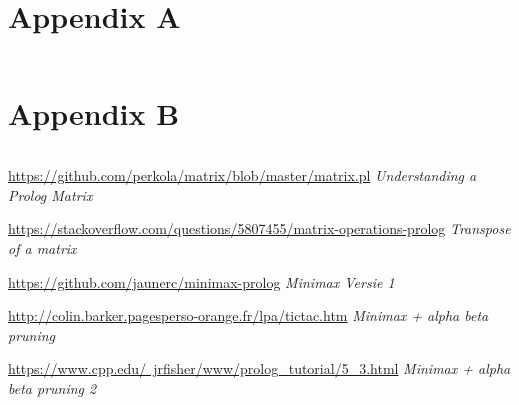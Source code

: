 \documentclass{article}
\begin{document}
\begin{appendices}
\section*{Appendix A}
\inputminted[firstline=104, lastline=124, linenos, breaklines]{prolog}{/Users/Victor/Documents/UGent/3BI/Logisch/Project/project/src/board.pl}

\section*{Appendix B}
\inputminted[firstline=155, lastline=183, linenos, breaklines]{prolog}{/Users/Victor/Documents/UGent/3BI/Logisch/Project/project/src/board.pl}

\end{appendices}

\begin{thebibliography}{5}

\href{https://github.com/perkola/matrix/blob/master/matrix.pl}{https://github.com/perkola/matrix/blob/master/matrix.pl}
\textit{Understanding a Prolog Matrix}

\href{https://stackoverflow.com/questions/5807455/matrix-operations-prolog}{https://stackoverflow.com/questions/5807455/matrix-operations-prolog}
\textit{Transpose of a matrix}

\href{https://github.com/jaunerc/minimax-prolog}{https://github.com/jaunerc/minimax-prolog}
\textit{Minimax Versie 1}

\href{http://colin.barker.pagesperso-orange.fr/lpa/tictac.htm}{http://colin.barker.pagesperso-orange.fr/lpa/tictac.htm}
\textit{Minimax + alpha beta pruning}

\href{https://www.cpp.edu/~jrfisher/www/prolog\_tutorial/5\_3.html}{https://www.cpp.edu/~jrfisher/www/prolog\_tutorial/5\_3.html}
\textit{Minimax + alpha beta pruning 2}

\end{thebibliography}
\end{document}
